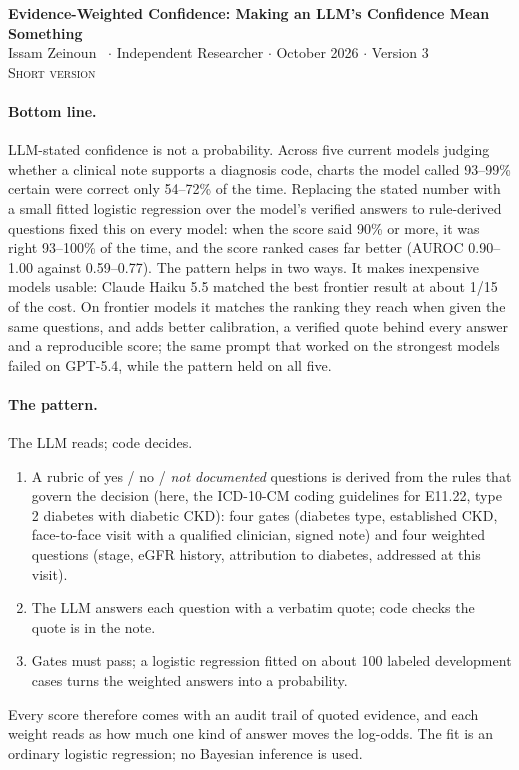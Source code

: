 \documentclass[10pt,letterpaper]{article}
\begin{document}
\begin{center}
{\Large\bfseries Evidence-Weighted Confidence: Making an LLM's Confidence Mean Something}\\[6pt]
Issam Zeinoun~ $\cdot$ Independent Researcher $\cdot$ October 2026 $\cdot$ Version 3\\[2pt]{\color{gray}\textsc{Short version}}
\end{center}

\paragraph{Bottom line.} LLM-stated confidence is not a probability. Across five current models judging whether a clinical note supports a diagnosis code, charts the model called 93--99\% certain were correct only 54--72\% of the time. Replacing the stated number with a small fitted logistic regression over the model's verified answers to rule-derived questions fixed this on every model: when the score said 90\% or more, it was right 93--100\% of the time, and the score ranked cases far better (AUROC 0.90--1.00 against 0.59--0.77). The pattern helps in two ways. It makes inexpensive models usable: Claude Haiku 5.5 matched the best frontier result at about 1/15 of the cost. On frontier models it matches the ranking they reach when given the same questions, and adds better calibration, a verified quote behind every answer and a reproducible score; the same prompt that worked on the strongest models failed on GPT-5.4, while the pattern held on all five.

\paragraph{The pattern.} The LLM reads; code decides.
\begin{enumerate}
  \item A rubric of yes / no / \emph{not documented} questions is derived from the rules that govern the decision (here, the ICD-10-CM coding guidelines for E11.22, type 2 diabetes with diabetic CKD): four gates (diabetes type, established CKD, face-to-face visit with a qualified clinician, signed note) and four weighted questions (stage, eGFR history, attribution to diabetes, addressed at this visit).
  \item The LLM answers each question with a verbatim quote; code checks the quote is in the note.
  \item Gates must pass; a logistic regression fitted on about 100 labeled development cases turns the weighted answers into a probability.
\end{enumerate}
Every score therefore comes with an audit trail of quoted evidence, and each weight reads as how much one kind of answer moves the log-odds. The fit is an ordinary logistic regression; no Bayesian inference is used.
\end{document}
